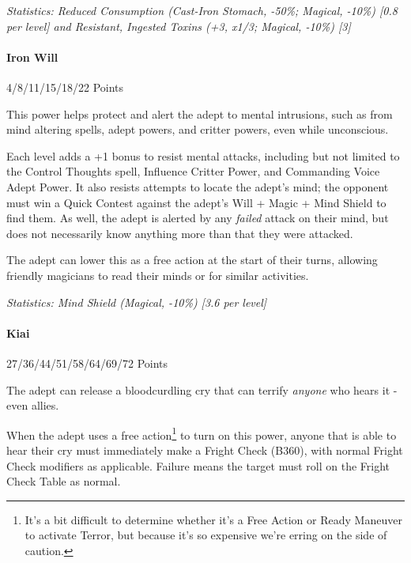 \begin{multicols*}{3}
		\textcolor{OliveGreen}{\textit{Statistics: Reduced Consumption (Cast-Iron Stomach, -50\%; Magical, -10\%) [0.8 per level] and Resistant, Ingested Toxins (+3, x1/3; Magical, -10\%) [3]}}
	
	\paragraph{Iron Will}
	\begin{flushright}
		4/8/11/15/18/22 Points
	\end{flushright}

		This power helps protect and alert the adept to mental intrusions, such as from mind altering spells, adept powers, and critter powers, even while unconscious.
		
		Each level adds a +1 bonus to resist mental attacks, including but not limited to the Control Thoughts spell, Influence Critter Power, and Commanding Voice Adept Power. It also resists attempts to locate the adept's mind; the opponent must win a Quick Contest against the adept's Will + Magic + Mind Shield to find them. As well, the adept is alerted by any \textit{failed} attack on their mind, but does not necessarily know anything more than that they were attacked.
		
		The adept can lower this as a free action at the start of their turns, allowing friendly magicians to read their minds or for similar activities.

		\textcolor{OliveGreen}{\textit{Statistics: Mind Shield (Magical, -10\%) [3.6 per level] }}
	
	\paragraph{Kiai}
	\begin{flushright}
		27/36/44/51/58/64/69/72 Points
	\end{flushright}

		The adept can release a bloodcurdling cry that can terrify \textit{anyone} who hears it - even allies.
		
		When the adept uses a free action\footnote{It's a bit difficult to determine whether it's a Free Action or Ready Maneuver to activate Terror, but because it's so expensive we're erring on the side of caution.} to turn on this power, anyone that is able to hear their cry must immediately make a Fright Check (B360), with normal Fright Check modifiers as applicable. Failure means the target must roll on the Fright Check Table as normal. 
		

\end{multicols*}
